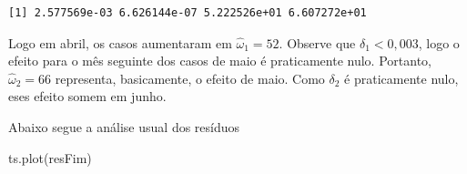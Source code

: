 \documentclass[
  letterpaper,
  DIV=11,
  numbers=noendperiod]{scrartcl}
\newenvironment{Shaded}{\begin{snugshade}}{\end{snugshade}}
\newcommand{\AttributeTok}[1]{\textcolor[rgb]{0.40,0.45,0.13}{#1}}
\newcommand{\CommentTok}[1]{\textcolor[rgb]{0.37,0.37,0.37}{#1}}
\newcommand{\ControlFlowTok}[1]{\textcolor[rgb]{0.00,0.23,0.31}{#1}}
\newcommand{\DecValTok}[1]{\textcolor[rgb]{0.68,0.00,0.00}{#1}}
\newcommand{\FunctionTok}[1]{\textcolor[rgb]{0.28,0.35,0.67}{#1}}
\newcommand{\NormalTok}[1]{\textcolor[rgb]{0.00,0.23,0.31}{#1}}
\newcommand{\OtherTok}[1]{\textcolor[rgb]{0.00,0.23,0.31}{#1}}
\newcommand{\SpecialCharTok}[1]{\textcolor[rgb]{0.37,0.37,0.37}{#1}}
\theoremstyle{plain}
\theoremstyle{plain}
\theoremstyle{definition}
\theoremstyle{definition}
\theoremstyle{remark}
\begin{document}
\begin{verbatim}
[1] 2.577569e-03 6.626144e-07 5.222526e+01 6.607272e+01
\end{verbatim}

Logo em abril, os casos aumentaram em \(\hat{\omega}_1=52\). Observe que
\(\delta_1<0,003\), logo o efeito para o mês seguinte dos casos de maio
é praticamente nulo. Portanto, \(\hat{\omega}_2=66\) representa,
basicamente, o efeito de maio. Como \(\delta_2\) é praticamente nulo,
eses efeito somem em junho.

\begin{Shaded}
\end{Shaded}

Abaixo segue a análise usual dos resíduos

\begin{Shaded}
\begin{Highlighting}[]
\FunctionTok{ts.plot}\NormalTok{(resFim)}
\end{Highlighting}
\end{Shaded}
\end{document}
